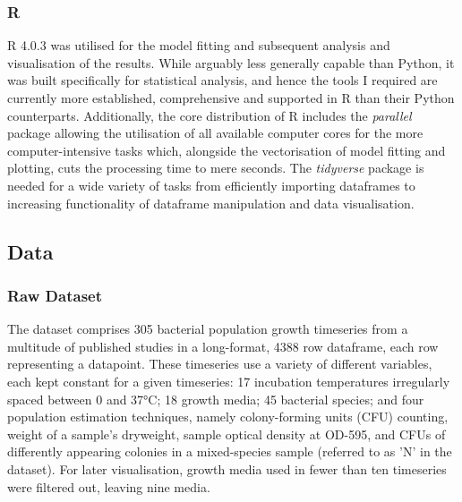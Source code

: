 \documentclass[11pt]{article}
\begin{document}
\subsubsection{R}
R 4.0.3 was utilised for the model fitting and subsequent analysis and visualisation of the results. While arguably less generally capable than Python, it was built specifically for statistical analysis, and hence the tools I required are currently more established, comprehensive and supported in R than their Python counterparts. Additionally, the core distribution of R includes the \textit{parallel} package allowing the utilisation of all available computer cores for the more computer-intensive tasks which, alongside the vectorisation of model fitting and plotting, cuts the processing time to mere seconds. The \textit{tidyverse} package is needed for a wide variety of tasks from efficiently importing dataframes to increasing functionality of dataframe manipulation and data visualisation. 



\subsection{Data}
\subsubsection{Raw Dataset}
 The dataset comprises 305 bacterial population growth timeseries from a multitude of published studies in a long-format, 4388 row dataframe, each row representing a datapoint. These timeseries use a variety of different variables, each kept constant for a given timeseries: 17 incubation temperatures irregularly spaced between 0 and 37°C; 18 growth media; 45 bacterial species; and four population estimation techniques, namely colony-forming units (CFU) counting, weight of a sample's dryweight, sample optical density at OD-595, and CFUs of differently appearing colonies in a mixed-species sample (referred to as 'N' in the dataset).\parencite{Al-qadiri2008} For later visualisation, growth media used in fewer than ten timeseries were filtered out, leaving nine media. 
\end{document}
